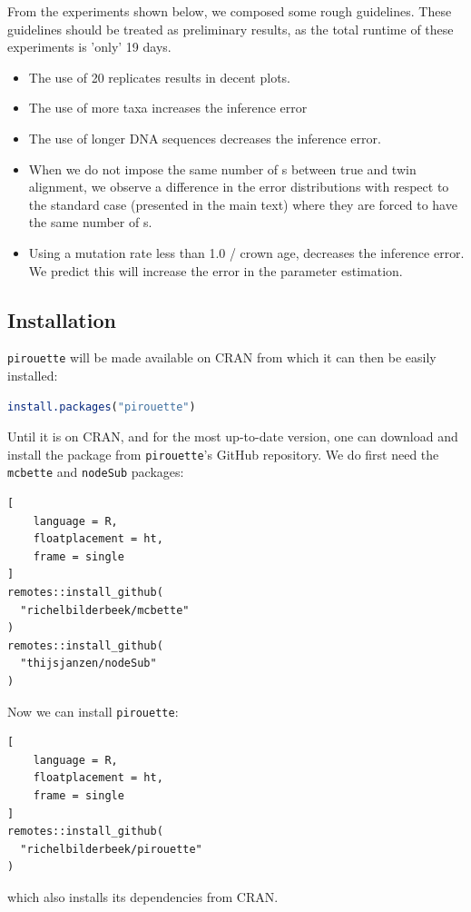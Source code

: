 From the experiments shown below, we composed some rough guidelines.
These guidelines should be treated as preliminary results, as
the total runtime of these experiments is 'only' 19 days.

\begin{itemize}
  \item{
    The use of 20 replicates results in decent plots.
  }
  \item{
    The use of more taxa increases the inference error
  }
  \item{
    The use of longer DNA sequences decreases the inference error.
  }
  \item{
    When we do not impose the same number of s 
    between true and twin alignment, we observe a difference in the error 
    distributions with respect to the standard case (presented in the main 
    text) where they are forced to have the same number of s.
  }
  \item{
    Using a mutation rate less than 1.0 / crown age, decreases the
    inference error. We predict this will increase the error in the parameter
    estimation.
  }
\end{itemize}

\subsection{Installation}
\label{subsec:installation}

\verb;pirouette; will be made available on CRAN from which 
it can then be easily installed:
\begin{lstlisting}[language=R, floatplacement=ht, frame=single]
install.packages("pirouette")
\end{lstlisting}

Until it is on CRAN, and for the most up-to-date version, 
one can download and install the package from \verb;pirouette;'s GitHub 
repository. We do first need the \verb;mcbette; and \verb;nodeSub; packages:
\begin{lstlisting}[
    language = R,
    floatplacement = ht,
    frame = single
]
remotes::install_github(
  "richelbilderbeek/mcbette"
)
remotes::install_github(
  "thijsjanzen/nodeSub"
)
\end{lstlisting}

Now we can install \verb;pirouette;:
\begin{lstlisting}[
    language = R,
    floatplacement = ht,
    frame = single
]
remotes::install_github(
  "richelbilderbeek/pirouette"
)
\end{lstlisting}
which also installs its dependencies from CRAN.

